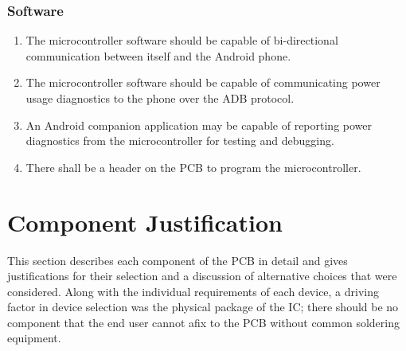\documentclass{article}
\numberwithin{figure}{section}
\numberwithin{equation}{section}
\begin{document}
{\begin{enumerate}[align=left,leftmargin=*, labelindent= 0em, label=\textbf{Requirement \thesubsubsection.\arabic*.}, itemindent=0em]
\end{enumerate}
\subsubsection{Software} \label{sect:software2}
\begin{enumerate}[align=left,leftmargin=*, labelindent= 0em, label=\textbf{Requirement \thesubsubsection.\arabic*.}, itemindent=0em]
\item \label{SW1}The microcontroller software should be capable of bi-directional communication between itself and the Android phone.
\item \label{SW2}The microcontroller software should be capable of communicating power usage diagnostics to the phone over the ADB protocol.
\item \label{SW3}An Android companion application may be capable of reporting power diagnostics from the microcontroller for testing and debugging.
\item \label{SW4}There shall be a header on the PCB to program the microcontroller.
\end{enumerate}

\section{Component Justification} \label{sect:justification}
This section describes each component of the PCB in detail and gives justifications for their selection and a discussion of alternative choices that were considered. Along with the individual requirements of each device, a driving factor in device selection was the physical package of the IC; there should be no component that the end user cannot afix to the PCB without common soldering equipment.

}
\end{document}

